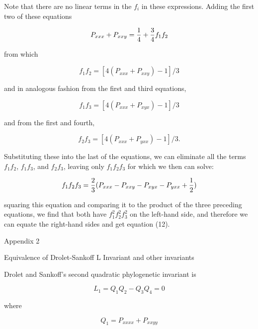 Note that there are no linear terms in the $f_i$ in these expressions.  Adding 
the first two of these equations

\begin{equation}
P_{xxx} + P_{xxy}  =  {1 \over 4} + {3 \over 4} f_1f_2
\end{equation}

from which

\begin{equation}
f_1f_2  =  [ 4 (P_{xxx} + P_{xxy}) - 1 ] / 3
\end{equation}

and in analogous fashion from the first and third equations,

\begin{equation}
f_1f_3  =  [ 4 (P_{xxx} + P_{xyx}) - 1 ] / 3
\end{equation}

and from the first and fourth,

\begin{equation}
f_2f_3  =  [ 4 (P_{xxx} + P_{yxx}) - 1 ] / 3.
\end{equation}

Substituting these into the last of the equations, we can eliminate all
the terms $f_1f_2$, $f_1f_3$, and $f_2f_3$, leaving only $f_1f_2f_3$ for which
we then can solve:

\begin{equation}
f_1f_2f_3  =  {2 \over 3} (P_{xxx} - P_{xxy} - P_{xyx} - P_{yxx} + {1 \over 2}) 
\end{equation}

squaring this equation and comparing it to the product of the three
preceding  equations, we find that both have $f_1^2f_2^2f_3^2$ on the
left-hand side, and therefore we can equate the right-hand sides and
get equation (12).


\bigskip

\centerline{Appendix 2}
\medskip

\centerline{Equivalence of Drolet-Sankoff L Invariant and other invariants}
\medskip


Drolet and Sankoff's second quadratic phylogenetic invariant is

\begin{equation}
L_1 = Q_1 Q_2 - Q_3 Q_4 = 0
\end{equation}

where

\begin{equation}
Q_1 = P_{xxxx} + P_{xxyy}
\end{equation}

